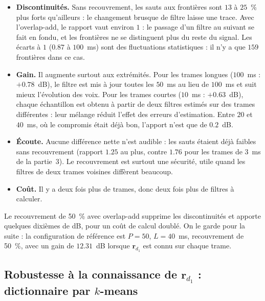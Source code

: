 \begin{interpretation}
\begin{itemize}
  \item \textbf{Discontinuités.} Sans recouvrement, les sauts aux frontières sont $13$ à $25$~\% plus forts qu'ailleurs : le changement brusque de filtre laisse une trace. Avec l'overlap-add, le rapport vaut environ $1$ : le passage d'un filtre au suivant se fait en fondu, et les frontières ne se distinguent plus du reste du signal. Les écarts à $1$ ($0.87$ à $100$~ms) sont des fluctuations statistiques : il n'y a que $159$ frontières dans ce cas.
  \item \textbf{Gain.} Il augmente surtout aux extrémités. Pour les trames longues ($100$~ms : $+0.78$~dB), le filtre est mis à jour toutes les $50$~ms au lieu de $100$~ms et suit mieux l'évolution des voix. Pour les trames courtes ($10$~ms : $+0.63$~dB), chaque échantillon est obtenu à partir de deux filtres estimés sur des trames différentes : leur mélange réduit l'effet des erreurs d'estimation. Entre $20$ et $40$~ms, où le compromis était déjà bon, l'apport n'est que de $0.2$~dB.
  \item \textbf{Écoute.} Aucune différence nette n'est audible : les sauts étaient déjà faibles sans recouvrement (rapport $1.25$ au plus, contre $1.76$ pour les trames de $3$~ms de la partie~3). Le recouvrement est surtout une sécurité, utile quand les filtres de deux trames voisines diffèrent beaucoup.
  \item \textbf{Coût.} Il y a deux fois plus de trames, donc deux fois plus de filtres à calculer.
\end{itemize}
\end{interpretation}

\begin{resultat}[Conclusion]
Le recouvrement de 50~\% avec overlap-add supprime les discontinuités et apporte quelques dixièmes de dB, pour un coût de calcul doublé. On le garde pour la suite : la configuration de référence est $P=50$, $L=40$~ms, recouvrement de 50~\%, avec un gain de $12.31$~dB lorsque $\mathbf{r}_{d_1}$ est connu sur chaque trame.
\end{resultat}

\subsection{Robustesse à la connaissance de \texorpdfstring{$\mathbf{r}_{d_1}$}{rd1} : dictionnaire par \texorpdfstring{$k$}{k}-means}

